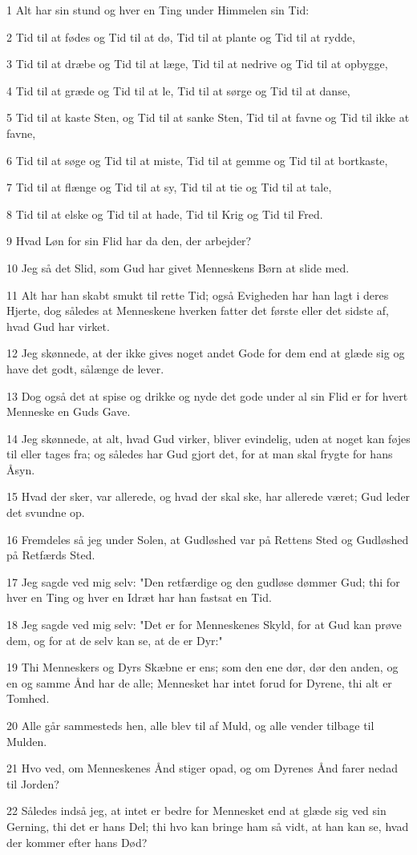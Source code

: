 \par 1 Alt har sin stund og hver en Ting under Himmelen sin Tid:
\par 2 Tid til at fødes og Tid til at dø, Tid til at plante og Tid til at rydde,
\par 3 Tid til at dræbe og Tid til at læge, Tid til at nedrive og Tid til at opbygge,
\par 4 Tid til at græde og Tid til at le, Tid til at sørge og Tid til at danse,
\par 5 Tid til at kaste Sten, og Tid til at sanke Sten, Tid til at favne og Tid til ikke at favne,
\par 6 Tid til at søge og Tid til at miste, Tid til at gemme og Tid til at bortkaste,
\par 7 Tid til at flænge og Tid til at sy, Tid til at tie og Tid til at tale,
\par 8 Tid til at elske og Tid til at hade, Tid til Krig og Tid til Fred.
\par 9 Hvad Løn for sin Flid har da den, der arbejder?
\par 10 Jeg så det Slid, som Gud har givet Menneskens Børn at slide med.
\par 11 Alt har han skabt smukt til rette Tid; også Evigheden har han lagt i deres Hjerte, dog således at Menneskene hverken fatter det første eller det sidste af, hvad Gud har virket.
\par 12 Jeg skønnede, at der ikke gives noget andet Gode for dem end at glæde sig og have det godt, sålænge de lever.
\par 13 Dog også det at spise og drikke og nyde det gode under al sin Flid er for hvert Menneske en Guds Gave.
\par 14 Jeg skønnede, at alt, hvad Gud virker, bliver evindelig, uden at noget kan føjes til eller tages fra; og således har Gud gjort det, for at man skal frygte for hans Åsyn.
\par 15 Hvad der sker, var allerede, og hvad der skal ske, har allerede været; Gud leder det svundne op.
\par 16 Fremdeles så jeg under Solen, at Gudløshed var på Rettens Sted og Gudløshed på Retfærds Sted.
\par 17 Jeg sagde ved mig selv: "Den retfærdige og den gudløse dømmer Gud; thi for hver en Ting og hver en Idræt har han fastsat en Tid.
\par 18 Jeg sagde ved mig selv: "Det er for Menneskenes Skyld, for at Gud kan prøve dem, og for at de selv kan se, at de er Dyr:"
\par 19 Thi Menneskers og Dyrs Skæbne er ens; som den ene dør, dør den anden, og en og samme Ånd har de alle; Mennesket har intet forud for Dyrene, thi alt er Tomhed.
\par 20 Alle går sammesteds hen, alle blev til af Muld, og alle vender tilbage til Mulden.
\par 21 Hvo ved, om Menneskenes Ånd stiger opad, og om Dyrenes Ånd farer nedad til Jorden?
\par 22 Således indså jeg, at intet er bedre for Mennesket end at glæde sig ved sin Gerning, thi det er hans Del; thi hvo kan bringe ham så vidt, at han kan se, hvad der kommer efter hans Død?

